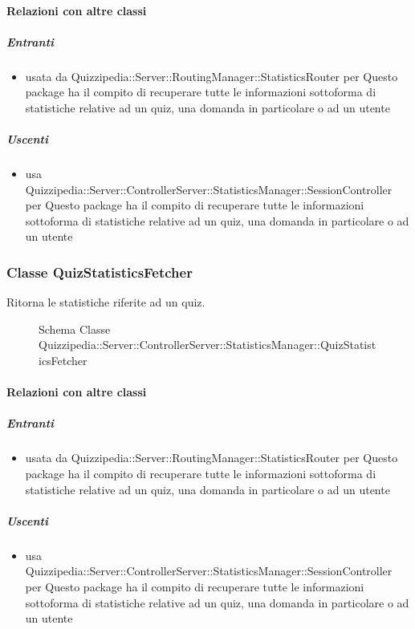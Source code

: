 \paragraph{Relazioni con altre classi}
\subparagraph{Entranti}
\begin{itemize}
\item usata da Quizzipedia::Server::RoutingManager::StatisticsRouter per Questo package ha il compito di recuperare tutte le informazioni sottoforma di statistiche relative ad un quiz, una domanda in particolare o ad un utente
\end{itemize}
\subparagraph{Uscenti}
\begin{itemize}
\item usa Quizzipedia::Server::ControllerServer::StatisticsManager::SessionController per Questo package ha il compito di recuperare tutte le informazioni sottoforma di statistiche relative ad un quiz, una domanda in particolare o ad un utente
\end{itemize}
\subsubsection{Classe QuizStatisticsFetcher}
Ritorna le statistiche riferite ad un quiz.
\begin{figure}[H]
\centering
\noindent{}
\caption[Schema Classe QuizStatisticsFetcher]{Schema Classe Quizzipedia::Server::ControllerServer::StatisticsManager::QuizStatisticsFetcher}
\end{figure}
\paragraph{Relazioni con altre classi}
\subparagraph{Entranti}
\begin{itemize}
\item usata da Quizzipedia::Server::RoutingManager::StatisticsRouter per Questo package ha il compito di recuperare tutte le informazioni sottoforma di statistiche relative ad un quiz, una domanda in particolare o ad un utente
\end{itemize}
\subparagraph{Uscenti}
\begin{itemize}
\item usa Quizzipedia::Server::ControllerServer::StatisticsManager::SessionController per Questo package ha il compito di recuperare tutte le informazioni sottoforma di statistiche relative ad un quiz, una domanda in particolare o ad un utente
\end{itemize}
